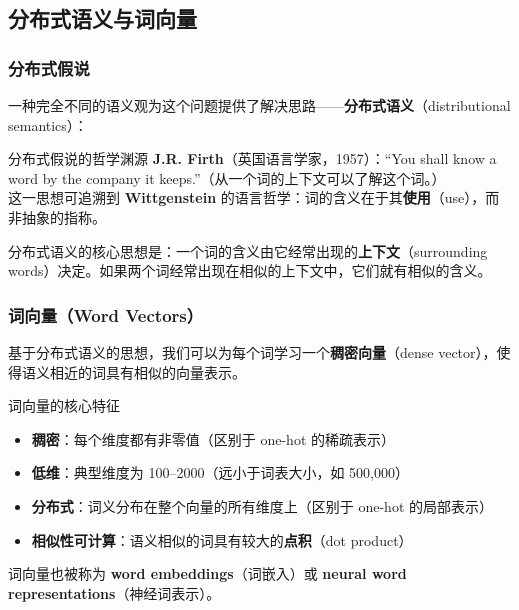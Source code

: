 \documentclass[a4paper]{article}
\begin{document}
\subsection{分布式语义与词向量}

\subsubsection{分布式假说}

一种完全不同的语义观为这个问题提供了解决思路——\textbf{分布式语义}（distributional semantics）：

\begin{knowledgebox}{分布式假说的哲学渊源}
\textbf{J.R. Firth}（英国语言学家，1957）：``You shall know a word by the company it keeps.''（从一个词的上下文可以了解这个词。）\\[3pt]
这一思想可追溯到 \textbf{Wittgenstein} 的语言哲学：词的含义在于其\textbf{使用}（use），而非抽象的指称。
\end{knowledgebox}





分布式语义的核心思想是：一个词的含义由它经常出现的\textbf{上下文}（surrounding words）决定。如果两个词经常出现在相似的上下文中，它们就有相似的含义。

\subsubsection{词向量（Word Vectors）}

基于分布式语义的思想，我们可以为每个词学习一个\textbf{稠密向量}（dense vector），使得语义相近的词具有相似的向量表示。





\begin{importantbox}{词向量的核心特征}
\begin{itemize}
    \item \textbf{稠密}：每个维度都有非零值（区别于 one-hot 的稀疏表示）
    \item \textbf{低维}：典型维度为 100--2000（远小于词表大小，如 500,000）
    \item \textbf{分布式}：词义分布在整个向量的所有维度上（区别于 one-hot 的局部表示）
    \item \textbf{相似性可计算}：语义相似的词具有较大的\textbf{点积}（dot product）
\end{itemize}
词向量也被称为 \textbf{word embeddings}（词嵌入）或 \textbf{neural word representations}（神经词表示）。
\end{importantbox}
\end{document}
